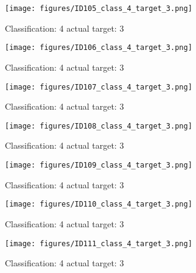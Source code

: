 \begin{figure}[h!]
\begin{center}
\texttt{[image: figures/ID105\_class\_4\_target\_3.png]}
\end{center}
\caption{ Classification: 4 actual target: 3}
\label{fig:ID105_class_4_target_3}
\end{figure}
\begin{figure}[h!]
\begin{center}
\texttt{[image: figures/ID106\_class\_4\_target\_3.png]}
\end{center}
\caption{ Classification: 4 actual target: 3}
\label{fig:ID106_class_4_target_3}
\end{figure}
\begin{figure}[h!]
\begin{center}
\texttt{[image: figures/ID107\_class\_4\_target\_3.png]}
\end{center}
\caption{ Classification: 4 actual target: 3}
\label{fig:ID107_class_4_target_3}
\end{figure}
\begin{figure}[h!]
\begin{center}
\texttt{[image: figures/ID108\_class\_4\_target\_3.png]}
\end{center}
\caption{ Classification: 4 actual target: 3}
\label{fig:ID108_class_4_target_3}
\end{figure}
\begin{figure}[h!]
\begin{center}
\texttt{[image: figures/ID109\_class\_4\_target\_3.png]}
\end{center}
\caption{ Classification: 4 actual target: 3}
\label{fig:ID109_class_4_target_3}
\end{figure}
\begin{figure}[h!]
\begin{center}
\texttt{[image: figures/ID110\_class\_4\_target\_3.png]}
\end{center}
\caption{ Classification: 4 actual target: 3}
\label{fig:ID110_class_4_target_3}
\end{figure}
\begin{figure}[h!]
\begin{center}
\texttt{[image: figures/ID111\_class\_4\_target\_3.png]}
\end{center}
\caption{ Classification: 4 actual target: 3}
\label{fig:ID111_class_4_target_3}
\end{figure}
